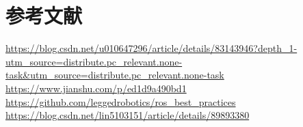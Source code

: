 \documentclass[12pt,UTF8]{ctexart}
\begin{document}
    \section{参考文献}
    \noindent[1]\url{https://blog.csdn.net/u010647296/article/details/83143946?depth_1-utm_source=distribute.pc_relevant.none-task&utm_source=distribute.pc_relevant.none-task}\\
    \noindent[2]\url{https://www.jianshu.com/p/ed1d9a490bd1}\\
    \noindent[3]\url{https://github.com/leggedrobotics/ros_best_practices}\\
    \noindent[4]\url{https://blog.csdn.net/lin5103151/article/details/89893380}\\
\end{document}
